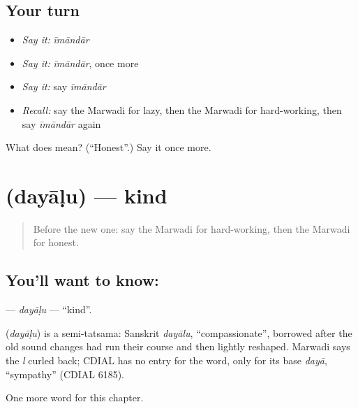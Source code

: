 \subsection*{Your turn}
\begin{itemize}
\raggedright
  \item \emph{Say it:} \emph{īmāndār}
  \item \emph{Say it:} \emph{īmāndār}, once more
  \item \emph{Say it:} say \emph{īmāndār}
  \item \emph{Recall:} say the Marwadi for lazy, then the Marwadi for hard-working, then say \emph{īmāndār} again
\end{itemize}

\begin{tcolorbox}[breakable,colback=teal!4,colframe=teal!35!black,title={Before you move on}]
What does  mean? (\textquotedblleft{}Honest\textquotedblright{}.) Say it once more.
\end{tcolorbox}
\section[\texorpdfstring{\mw{दयाळु} (dayāḷu)}{दयाळु (dayāḷu)}]{ (dayāḷu) — kind}

\label{lesson:MW-C147-dayalu}



\begin{quote}
Before the new one: say the Marwadi for hard-working, then the Marwadi for honest.
\end{quote}

\subsection*{You'll want to know: }
\textbf{} — \emph{dayāḷu} — \textquotedblleft{}kind\textquotedblright{}.

\begin{cousinweb}
\textbf{} (\emph{dayāḷu}) is a semi-tatsama: Sanskrit \emph{dayālu}, \textquotedblleft{}compassionate\textquotedblright{}, borrowed after the old sound changes had run their course and then lightly reshaped. Marwadi says the \emph{l} curled back; CDIAL has no entry for the word, only for its base \emph{dayā}, \textquotedblleft{}sympathy\textquotedblright{} (CDIAL 6185).
\end{cousinweb}

\begin{grammarlens}[title={What you've built}]
One more word for this chapter.
\end{grammarlens}

